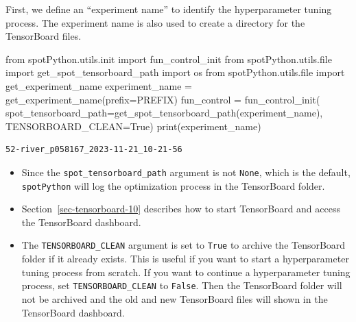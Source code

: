 \documentclass[
  letterpaper,
  DIV=11,
  numbers=noendperiod]{scrreprt}
\newenvironment{Shaded}{\begin{snugshade}}{\end{snugshade}}
\newcommand{\BuiltInTok}[1]{\textcolor[rgb]{0.00,0.23,0.31}{#1}}
\newcommand{\ImportTok}[1]{\textcolor[rgb]{0.00,0.46,0.62}{#1}}
\newcommand{\NormalTok}[1]{\textcolor[rgb]{0.00,0.23,0.31}{#1}}
\newcommand{\OperatorTok}[1]{\textcolor[rgb]{0.37,0.37,0.37}{#1}}
\newcommand{\VariableTok}[1]{\textcolor[rgb]{0.07,0.07,0.07}{#1}}
\providecommand{\tightlist}{%
  \setlength{\itemsep}{0pt}\setlength{\parskip}{0pt}}\usepackage{longtable,booktabs,array}
\begin{document}
First, we define an ``experiment name'' to identify the hyperparameter
tuning process. The experiment name is also used to create a directory
for the TensorBoard files.

\begin{Shaded}
\begin{Highlighting}[]
\ImportTok{from}\NormalTok{ spotPython.utils.init }\ImportTok{import}\NormalTok{ fun\_control\_init}
\ImportTok{from}\NormalTok{ spotPython.utils.}\BuiltInTok{file} \ImportTok{import}\NormalTok{ get\_spot\_tensorboard\_path}
\ImportTok{import}\NormalTok{ os}
\ImportTok{from}\NormalTok{ spotPython.utils.}\BuiltInTok{file} \ImportTok{import}\NormalTok{ get\_experiment\_name}
\NormalTok{experiment\_name }\OperatorTok{=}\NormalTok{ get\_experiment\_name(prefix}\OperatorTok{=}\NormalTok{PREFIX)}
\NormalTok{fun\_control }\OperatorTok{=}\NormalTok{ fun\_control\_init(}
\NormalTok{    spot\_tensorboard\_path}\OperatorTok{=}\NormalTok{get\_spot\_tensorboard\_path(experiment\_name),}
\NormalTok{    TENSORBOARD\_CLEAN}\OperatorTok{=}\VariableTok{True}\NormalTok{)}
\BuiltInTok{print}\NormalTok{(experiment\_name)}
\end{Highlighting}
\end{Shaded}

\begin{verbatim}
52-river_p058167_2023-11-21_10-21-56
\end{verbatim}

\begin{tcolorbox}[enhanced jigsaw, rightrule=.15mm, opacityback=0, colframe=quarto-callout-tip-color-frame, opacitybacktitle=0.6, toptitle=1mm, arc=.35mm, colbacktitle=quarto-callout-tip-color!10!white, coltitle=black, toprule=.15mm, leftrule=.75mm, titlerule=0mm, title=\textcolor{quarto-callout-tip-color}{\faLightbulb}\hspace{0.5em}{Tip: TensorBoard}, bottomrule=.15mm, breakable, bottomtitle=1mm, left=2mm, colback=white]

\begin{itemize}
\tightlist
\item
  Since the \texttt{spot\_tensorboard\_path} argument is not
  \texttt{None}, which is the default, \texttt{spotPython} will log the
  optimization process in the TensorBoard folder.
\item
  Section~\ref{sec-tensorboard-10} describes how to start TensorBoard
  and access the TensorBoard dashboard.
\item
  The \texttt{TENSORBOARD\_CLEAN} argument is set to \texttt{True} to
  archive the TensorBoard folder if it already exists. This is useful if
  you want to start a hyperparameter tuning process from scratch. If you
  want to continue a hyperparameter tuning process, set
  \texttt{TENSORBOARD\_CLEAN} to \texttt{False}. Then the TensorBoard
  folder will not be archived and the old and new TensorBoard files will
  shown in the TensorBoard dashboard.
\end{itemize}

\end{tcolorbox}
\end{document}
